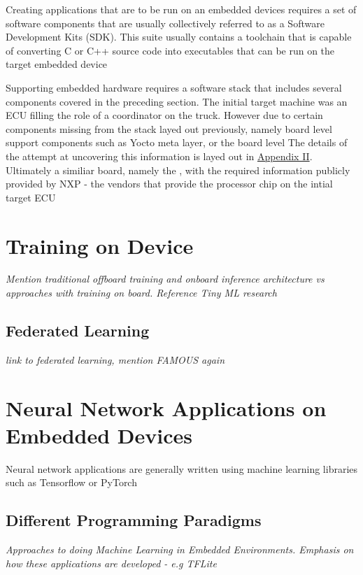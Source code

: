 Creating applications that are to be run on an embedded devices requires a set of software components that are usually collectively referred to as a Software Development Kits (SDK). This suite usually contains a toolchain that is capable of converting C or C++ source code into executables that can be run on the target embedded device

Supporting embedded hardware requires a software stack that includes several components covered in the preceding section. The initial target machine was an ECU filling the role of a coordinator on the truck. However due to certain components missing from the stack layed out previously, namely board level support components such as Yocto meta layer, or the board level The details of the attempt at uncovering this information is layed out in \hyperref[rtc-c300]{Appendix II}. Ultimately a similiar board, namely the , with the required information publicly provided by NXP - the vendors that provide the processor chip on the intial target ECU

\section{Training on Device}

\textit{Mention traditional offboard training and onboard inference architecture vs approaches with training on board. Reference Tiny ML research}

\subsection{Federated Learning}

\textit{link to federated learning, mention FAMOUS again}

\section{Neural Network Applications on Embedded Devices}

Neural network applications are generally written using machine learning libraries such as Tensorflow or PyTorch

\subsection{Different Programming Paradigms}
\textit{Approaches to doing Machine Learning in Embedded Environments. Emphasis on how these applications are developed - e.g TFLite}

